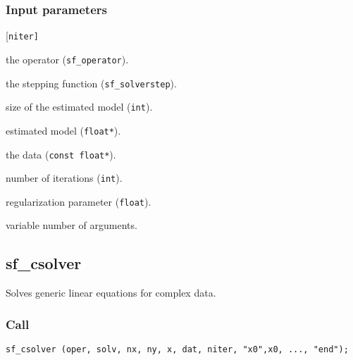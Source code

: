 \subsubsection*{Input parameters}
\begin{desclist}{\tt }{\quad}[\tt niter]
   \setlength\itemsep{0pt}
   \item[oper]  the operator (\texttt{sf\_operator}).
   \item[solv]  the stepping function (\texttt{sf\_solverstep}).  
   \item[nx]    size of the estimated model  (\texttt{int}).  
   \item[x]     estimated model  (\texttt{float*}).  
   \item[dat]   the data (\texttt{const float*}).  
   \item[niter] number of iterations (\texttt{int}).  
   \item[eps]   regularization parameter (\texttt{float}).  
   \item[...]   variable number of arguments.
\end{desclist}




\subsection{{sf\_csolver}}
Solves generic linear equations for complex data.

\subsubsection*{Call}
\begin{verbatim}sf_csolver (oper, solv, nx, ny, x, dat, niter, "x0",x0, ..., "end");\end{verbatim}

